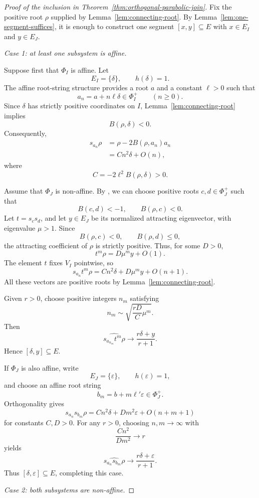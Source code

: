 \documentclass[11pt,reqno]{amsart}
\theoremstyle{plain}
\theoremstyle{definition}
\theoremstyle{remark}
\numberwithin{equation}{section}
\begin{document}
\begin{proof}[Proof of the inclusion in
Theorem~\ref{thm:orthogonal-parabolic-join}]
Fix the positive root $\rho$ supplied by
Lemma~\ref{lem:connecting-root}. By
Lemma~\ref{lem:one-segment-suffices}, it is enough to construct one
segment $[x,y]\subseteq E$ with $x\in E_I$ and $y\in E_J$.

\medskip
\noindent
\textit{Case 1: at least one subsystem is affine.}

Suppose first that $\Phi_I$ is affine. Let
\[
E_I=\{\delta\},
\qquad h(\delta)=1.
\]
The affine root-string structure provides a root $a$ and a
constant $\ell>0$ such that
\[
a_n=a+n\ell\delta\in\Phi_I^+
\qquad(n\ge0).
\]
Since $\delta$ has strictly positive coordinates on $I$,
Lemma~\ref{lem:connecting-root} implies
\[
B(\rho,\delta)<0.
\]
Consequently,
\[
\begin{aligned}
s_{a_n}\rho
&=\rho-2B(\rho,a_n)a_n\\
&=Cn^2\delta+O(n),
\end{aligned}
\]
where
\[
C=-2\ell^2B(\rho,\delta)>0.
\]

Assume that $\Phi_J$ is non-affine. By
\cite[Proposition~6.4]{DHR}, we can choose positive roots
$c,d\in\Phi_J^+$ such that
\[
B(c,d)<-1,
\qquad B(\rho,c)<0.
\]
Let $t=s_cs_d$, and let $y\in E_J$ be its normalized attracting
eigenvector, with eigenvalue $\mu>1$. Since
\[
B(\rho,c)<0,\qquad B(\rho,d)\le0,
\]
the attracting coefficient of $\rho$ is strictly positive.
Thus, for some $D>0$,
\[
t^m\rho=D\mu^m y+O(1).
\]
The element $t$ fixes $V_I$ pointwise, so
\[
s_{a_n}t^m\rho
=
Cn^2\delta+D\mu^m y+O(n+1).
\]
All these vectors are positive roots by
Lemma~\ref{lem:connecting-root}.

Given $r>0$, choose positive integers $n_m$ satisfying
\[
n_m\sim\sqrt{\frac{rD}{C}\mu^m}.
\]
Then
\[
\widehat{s_{a_{n_m}}t^m\rho}
\longrightarrow
\frac{r\delta+y}{r+1}.
\]
Hence $[\delta,y]\subseteq E$.

If $\Phi_J$ is also affine, write
\[
E_J=\{\varepsilon\},
\qquad h(\varepsilon)=1,
\]
and choose an affine root string
\[
b_m=b+m\ell'\varepsilon\in\Phi_J^+.
\]
Orthogonality gives
\[
s_{a_n}s_{b_m}\rho
=
Cn^2\delta+Dm^2\varepsilon+O(n+m+1)
\]
for constants $C,D>0$.
For any $r>0$, choosing $n,m\to\infty$ with
\[
\frac{Cn^2}{Dm^2}\longrightarrow r
\]
yields
\[
\widehat{s_{a_n}s_{b_m}\rho}
\longrightarrow
\frac{r\delta+\varepsilon}{r+1}.
\]
Thus $[\delta,\varepsilon]\subseteq E$, completing this case.

\medskip
\noindent
\textit{Case 2: both subsystems are non-affine.}


\end{proof}
\end{document}
